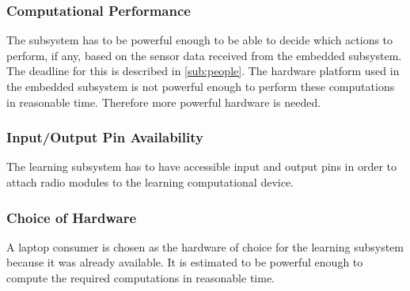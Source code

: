 \subsubsection{Computational Performance}
The subsystem has to be powerful enough to be able to decide which actions to perform, if any, based on the sensor data received from the embedded subsystem. The deadline for this is described in \cref{sub:people}. The hardware platform used in the embedded subsystem is not powerful enough to perform these computations in reasonable time. Therefore more powerful hardware is needed.

\subsubsection{Input/Output Pin Availability}
The learning subsystem has to have accessible input and output pins in order to attach radio modules to the learning computational device.

\subsubsection{Choice of Hardware}
A laptop consumer is chosen as the hardware of choice for the learning subsystem because it was already available. It is estimated to be powerful enough to compute the required computations in reasonable time.
